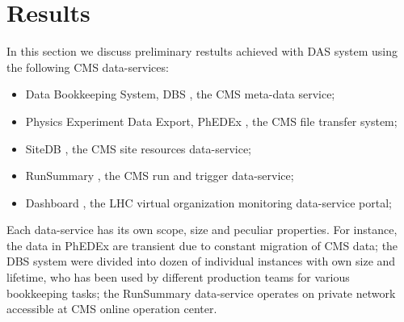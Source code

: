 \documentclass[1p,times]{elsarticle}
\begin{document}
\section{Results\label{Results}}
In this section we discuss preliminary restults achieved with DAS system
using the following CMS data-services:
\begin{itemize}
\item Data Bookkeeping System, DBS \cite{DBS}, the CMS meta-data service;
\item Physics Experiment Data Export, PhEDEx \cite {PhEDEx}, the 
CMS file transfer system;
\item SiteDB \cite{SiteDB}, the CMS site resources data-service;
\item RunSummary \cite{RunSummary}, the CMS run and trigger data-service;
\item Dashboard \cite{Dashboard}, the LHC virtual organization
monitoring data-service portal;
\end{itemize}
Each data-service has its own scope, size and peculiar properties. 
For instance, the data in PhEDEx are transient due to constant 
migration of CMS data; the DBS system were divided into dozen 
of individual instances with own size and lifetime, who has been used by different production 
teams for various bookkeeping tasks; the RunSummary data-service
operates on private network accessible at CMS online operation center.

\end{document}
